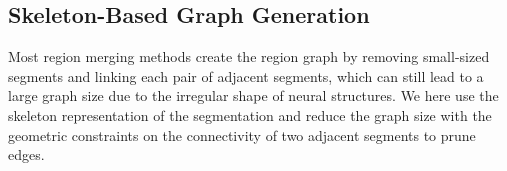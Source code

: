 \subsection{Skeleton-Based Graph Generation}
\label{sec:skeletonization}
Most region merging methods create the region graph by removing small-sized segments and linking each pair of adjacent segments, which can still lead to a large graph size due to the irregular shape of neural structures.
We here use the skeleton representation of the segmentation and reduce the graph size with the geometric constraints on the connectivity of two adjacent segments to prune edges.



